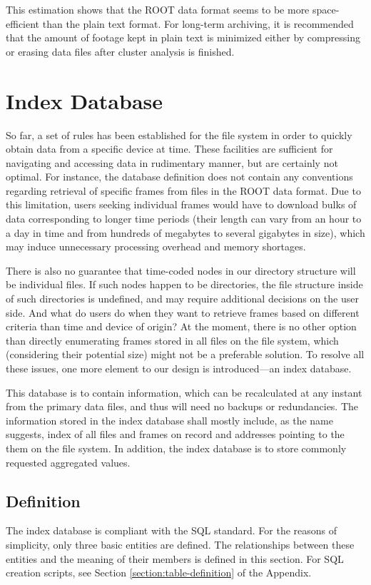 This estimation shows that the ROOT data format seems to be more space-efficient than the plain text format. For long-term archiving, it is recommended that the amount of footage kept in plain text is minimized either by compressing or erasing data files after cluster analysis is finished.

\section{Index Database}
So far, a set of rules has been established for the file system in order to quickly obtain data from a specific device at time. These facilities are sufficient for navigating and accessing data in rudimentary manner, but are certainly not optimal. For instance, the database definition does not contain any conventions regarding retrieval of specific frames from files in the ROOT data format. Due to this limitation, users seeking individual frames would have to download bulks of data corresponding to longer time periods (their length can vary from an hour to a day in time and from hundreds of megabytes to several gigabytes in size), which may induce unnecessary processing overhead and memory shortages.

There is also no guarantee that time-coded nodes in our directory structure will be individual files. If such nodes happen to be directories, the file structure inside of such directories is undefined, and may require additional decisions on the user side. And what do users do when they want to retrieve frames based on different criteria than time and device of origin? At the moment, there is no other option than directly enumerating frames stored in all files on the file system, which (considering their potential size) might not be a preferable solution. To resolve all these issues, one more element to our design is introduced---an index database.

This database is to contain information, which can be recalculated at any instant from the primary data files, and thus will need no backups or redundancies. The information stored in the index database shall mostly include, as the name suggests, index of all files and frames on record and addresses pointing to the them on the file system. In addition, the index database is to store commonly requested aggregated values.

\subsection{Definition}
The index database is compliant with the SQL standard. For the reasons of simplicity, only three basic entities are defined. The relationships between these entities and the meaning of their members is defined in this section. For SQL creation scripts, see Section \ref{section:table-definition} of the Appendix.

